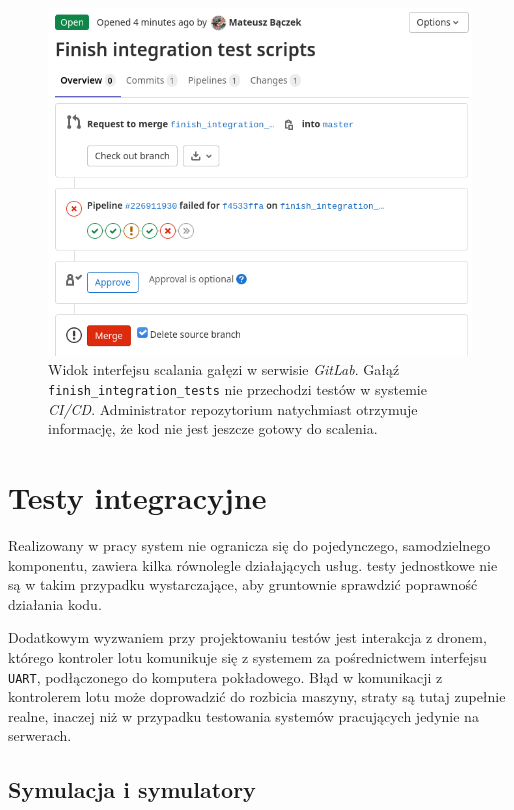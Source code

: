 \begin{figure}[H]
	\centering
	\includegraphics[width=0.8\linewidth]{rys05/failed_pipeline.png}
    \caption{
        Widok interfejsu scalania gałęzi w serwisie \textit{GitLab}.
        Gałąź \texttt{finish\_integration\_tests} nie przechodzi testów
        w systemie \textit{CI/CD}. Administrator repozytorium natychmiast
        otrzymuje informację, że kod nie jest jeszcze gotowy do scalenia.
    }
	\label{failed_pipeline}
\end{figure}


\section{Testy integracyjne}

Realizowany w pracy system nie ogranicza się do pojedynczego,
samodzielnego komponentu, zawiera kilka równolegle działających
usług. testy jednostkowe nie są w takim przypadku wystarczające,
aby gruntownie sprawdzić poprawność działania kodu. 

Dodatkowym wyzwaniem przy projektowaniu testów jest interakcja z dronem,
którego kontroler lotu komunikuje się z systemem za pośrednictwem 
interfejsu \texttt{UART}, podłączonego do komputera pokładowego.
Błąd w komunikacji z kontrolerem lotu może doprowadzić do 
rozbicia maszyny, straty są tutaj zupełnie realne, inaczej
niż w przypadku testowania systemów pracujących jedynie na serwerach. 

\subsection{
    Symulacja i symulatory
    \color{white}\cite{simulation_and_simulacra}}

